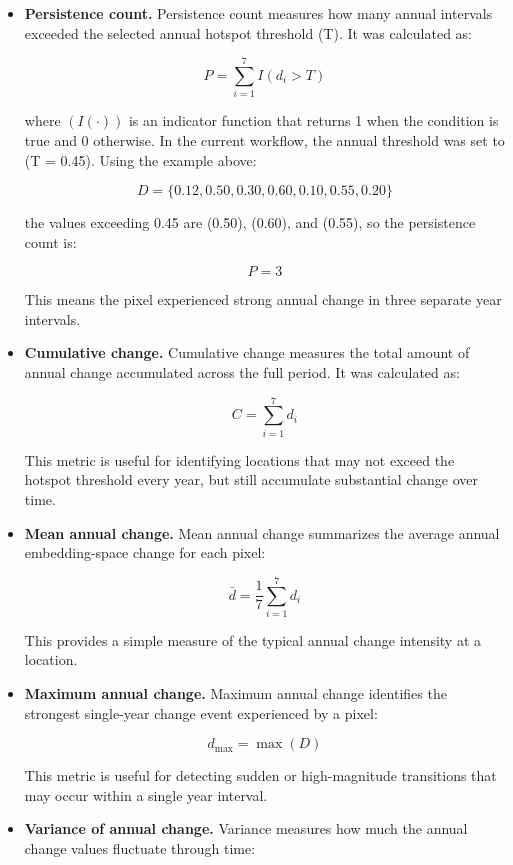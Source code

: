 \documentclass[11pt,a4paper]{article}
\begin{document}
\begin{itemize}[leftmargin=*]

    \item \textbf{Persistence count.} Persistence count measures how many annual intervals exceeded the selected annual hotspot threshold (T). It was calculated as:

    \[P = \sum_{i=1}^{7} I(d_i > T)\]

    where $(I(\cdot))$ is an indicator function that returns 1 when the condition is true and 0 otherwise. In the current workflow, the annual threshold was set to (T = 0.45). Using the example above:

    \[D = \{0.12, 0.50, 0.30, 0.60, 0.10, 0.55, 0.20\}\]

    the values exceeding 0.45 are (0.50), (0.60), and (0.55), so the persistence count is:

    \[P = 3\]

    This means the pixel experienced strong annual change in three separate year intervals.

    \item \textbf{Cumulative change.} Cumulative change measures the total amount of annual change accumulated across the full period. It was calculated as:

    \[C = \sum_{i=1}^{7} d_i\]

    This metric is useful for identifying locations that may not exceed the hotspot threshold every year, but still accumulate substantial change over time.

    \item \textbf{Mean annual change.} Mean annual change summarizes the average annual embedding-space change for each pixel:

    \[\bar{d} = \frac{1}{7}\sum_{i=1}^{7} d_i\]

    This provides a simple measure of the typical annual change intensity at a location.

    \item \textbf{Maximum annual change.} Maximum annual change identifies the strongest single-year change event experienced by a pixel:

    \[d_{\max} = \max(D)\]

    This metric is useful for detecting sudden or high-magnitude transitions that may occur within a single year interval.

    \item \textbf{Variance of annual change.} Variance measures how much the annual change values fluctuate through time:


\end{itemize}
\end{document}
